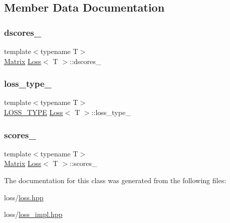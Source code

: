\subsection{Member Data Documentation}
\mbox{\label{class_loss_a825f6b10be0c8cca8e7335d9eb36a08a}} 
\subsubsection{\texorpdfstring{dscores\_}{dscores\_}}
{\footnotesize\ttfamily template$<$typename T$>$ \\
\mbox{\hyperlink{class_loss_a0cb2ca4ba669a18f628d747a995cd26c}{Matrix}} \mbox{\hyperlink{class_loss}{Loss}}$<$ T $>$\+::dscores\+\_\+\hspace{0.3cm}{\ttfamily [protected]}}

\mbox{\label{class_loss_a4644165153615ba6b8cdbcff61785555}} 
\subsubsection{\texorpdfstring{loss\_type\_}{loss\_type\_}}
{\footnotesize\ttfamily template$<$typename T$>$ \\
\mbox{\hyperlink{loss_8hpp_a72b6675b9bd68360ebc6e54006d8220f}{L\+O\+S\+S\+\_\+\+T\+Y\+PE}} \mbox{\hyperlink{class_loss}{Loss}}$<$ T $>$\+::loss\+\_\+type\+\_\+\hspace{0.3cm}{\ttfamily [protected]}}

\mbox{\label{class_loss_a7461ce8c4cce7e4ae76082745003a732}} 
\subsubsection{\texorpdfstring{scores\_}{scores\_}}
{\footnotesize\ttfamily template$<$typename T$>$ \\
\mbox{\hyperlink{class_loss_a0cb2ca4ba669a18f628d747a995cd26c}{Matrix}} \mbox{\hyperlink{class_loss}{Loss}}$<$ T $>$\+::scores\+\_\+\hspace{0.3cm}{\ttfamily [protected]}}



The documentation for this class was generated from the following files\+:\begin{DoxyCompactItemize}
\item 
loss/\mbox{\hyperlink{loss_8hpp}{loss.\+hpp}}\item 
loss/\mbox{\hyperlink{loss__impl_8hpp}{loss\+\_\+impl.\+hpp}}\end{DoxyCompactItemize}
